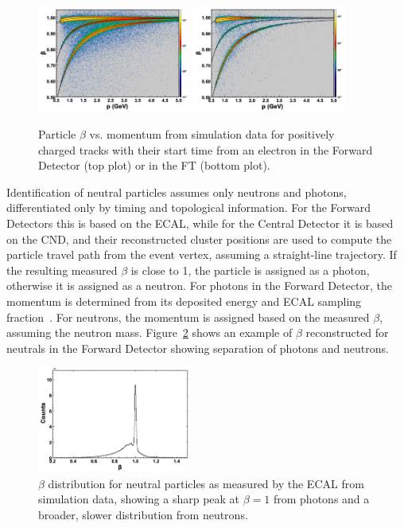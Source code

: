 \begin{figure}[t]
\centering
\includegraphics[width=0.45\textwidth]{pics/ftof_betap.png}
\includegraphics[width=0.45\textwidth]{pics/ft_betap.png}
\caption{Particle $\beta$ vs. momentum from simulation data for positively charged tracks with their start time
  from an electron in the Forward Detector (top plot) or in the FT (bottom plot).}
\label{fig:betavsp}
\end{figure}

Identification of neutral particles assumes only neutrons and photons, differentiated only by timing and
topological information. For the Forward Detectors this is based on the ECAL, while for the Central Detector it
is based on the CND, and their reconstructed cluster positions are used to compute the particle travel path from
the event vertex, assuming a straight-line trajectory. If the resulting measured $\beta$ is close to 1, the particle
is assigned as a photon, otherwise it is assigned as a neutron. For photons in the Forward Detector, the momentum
is determined from its deposited energy and ECAL sampling fraction~\cite{ecal-nim}. For neutrons, the momentum
is assigned based on the measured $\beta$, assuming the neutron mass. Figure~\ref{fig:neutbeta} shows an
example of $\beta$ reconstructed for neutrals in the Forward Detector showing separation of photons and neutrons.

\begin{figure}
\centering
\includegraphics[width=0.45\textwidth]{pics/neutral_beta.png}
\caption{$\beta$ distribution for neutral particles as measured by the ECAL from simulation data, showing a sharp
  peak at $\beta=1$ from photons and a broader, slower distribution from neutrons.}
\label{fig:neutbeta}
\end{figure}

